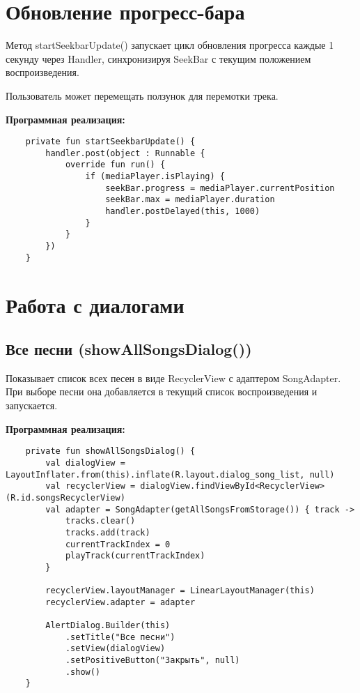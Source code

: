 \section{Обновление прогресс-бара}

Метод startSeekbarUpdate() запускает цикл обновления прогресса каждые 1 секунду через Handler, синхронизируя SeekBar с текущим положением воспроизведения.

Пользователь может перемещать ползунок для перемотки трека.

\textbf{Программная реализация:}
\begin{verbatim}
	private fun startSeekbarUpdate() {
        handler.post(object : Runnable {
            override fun run() {
                if (mediaPlayer.isPlaying) {
                    seekBar.progress = mediaPlayer.currentPosition
                    seekBar.max = mediaPlayer.duration
                    handler.postDelayed(this, 1000)
                }
            }
        })
    }
\end{verbatim}

\section{Работа с диалогами}

\subsection{Все песни (showAllSongsDialog())}

Показывает список всех песен в виде RecyclerView с адаптером SongAdapter. При выборе песни она добавляется в текущий список воспроизведения и запускается.

\textbf{Программная реализация:}
\begin{verbatim}
	private fun showAllSongsDialog() {
        val dialogView = LayoutInflater.from(this).inflate(R.layout.dialog_song_list, null)
        val recyclerView = dialogView.findViewById<RecyclerView>(R.id.songsRecyclerView)
        val adapter = SongAdapter(getAllSongsFromStorage()) { track ->
            tracks.clear()
            tracks.add(track)
            currentTrackIndex = 0
            playTrack(currentTrackIndex)
        }

        recyclerView.layoutManager = LinearLayoutManager(this)
        recyclerView.adapter = adapter

        AlertDialog.Builder(this)
            .setTitle("Все песни")
            .setView(dialogView)
            .setPositiveButton("Закрыть", null)
            .show()
    }
\end{verbatim}

